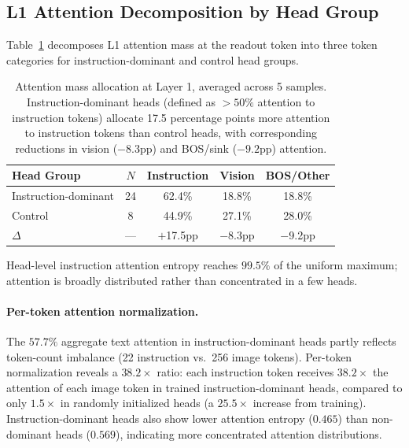 \subsection{L1 Attention Decomposition by Head Group}
\label{sec:attention_decomp}

Table~\ref{tab:attention_decomp} decomposes L1 attention mass at the readout token into three token categories for instruction-dominant and control head groups.

\begin{table}[h]
\centering
\caption{Attention mass allocation at Layer 1, averaged across 5 samples. Instruction-dominant heads (defined as $>50\%$ attention to instruction tokens) allocate 17.5 percentage points more attention to instruction tokens than control heads, with corresponding reductions in vision ($-8.3$pp) and BOS/sink ($-9.2$pp) attention.}
\label{tab:attention_decomp}
\small
\begin{tabular}{lcccc}
\toprule
\textbf{Head Group} & \textbf{$N$} & \textbf{Instruction} & \textbf{Vision} & \textbf{BOS/Other} \\
\midrule
Instruction-dominant & 24 & 62.4\% & 18.8\% & 18.8\% \\
Control & 8 & 44.9\% & 27.1\% & 28.0\% \\
\midrule
$\Delta$ & --- & $+$17.5pp & $-$8.3pp & $-$9.2pp \\
\bottomrule
\end{tabular}
\end{table}

Head-level instruction attention entropy reaches $99.5\%$ of the uniform maximum; attention is broadly distributed rather than concentrated in a few heads.

\paragraph{Per-token attention normalization.}
The $57.7\%$ aggregate text attention in instruction-dominant heads partly reflects token-count imbalance (22 instruction vs.\ 256 image tokens).
Per-token normalization reveals a $38.2\times$ ratio: each instruction token receives $38.2\times$ the attention of each image token in trained instruction-dominant heads, compared to only $1.5\times$ in randomly initialized heads (a $25.5\times$ increase from training).
Instruction-dominant heads also show lower attention entropy ($0.465$) than non-dominant heads ($0.569$), indicating more concentrated attention distributions.

